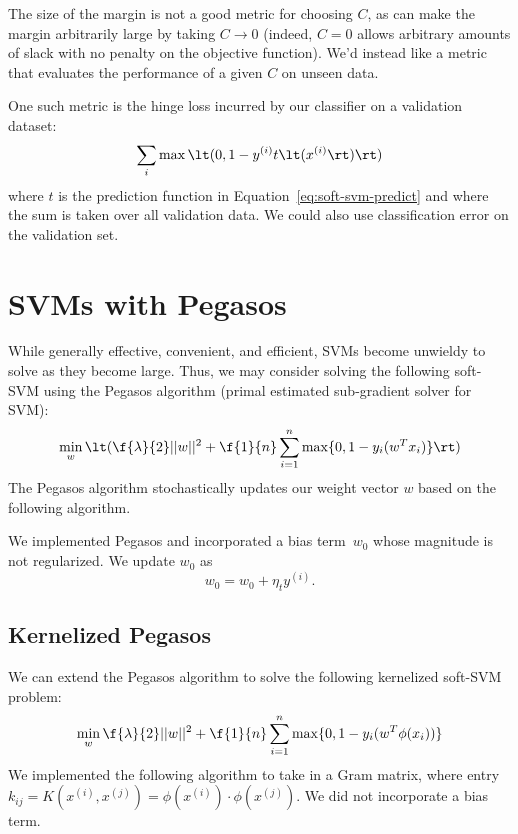 \documentclass{article}
\newcommand{\sind}[1]{^{(#1)}}
\begin{document}
\begin{multicols}{2}
The size of the margin
is not a good metric for choosing $C$,
as can make the margin arbitrarily large
by taking $C \to 0$
(indeed, $C = 0$ allows arbitrary amounts of slack
with no penalty on the objective function).
We'd instead like a metric that evaluates
the performance of a given $C$
on unseen data.

One such metric is the hinge loss incurred
by our classifier on a validation dataset:
\begin{equation}
    \sum_{i} \max\lt(0, 1 - y\sind{i} t\lt(x\sind{i}\rt)\rt)
\end{equation}
where $t$ is the prediction function in Equation~\ref{eq:soft-svm-predict}
and where the sum is taken over all validation data.
We could also use classification error on the validation set.



\section{SVMs with Pegasos}

While generally effective, convenient, and efficient,
SVMs become unwieldy to solve as they become large.
Thus, we may consider solving the following soft-SVM
using the Pegasos algorithm
(primal estimated sub-gradient solver for SVM):
\begin{equation}
   \min_w \lt( \f{\lambda}{2}||w||^2 + \f{1}{n}\sum_{i=1}^n{\max\{0,1-y_i(w^Tx_i)\}} \rt)
\end{equation}
The Pegasos algorithm stochastically updates our weight vector $w$ based on the following algorithm.


We implemented Pegasos and incorporated a bias term~$w_0$ whose magnitude is not regularized.
We update $w_0$ as
\begin{equation}\label{eq:pegasos-svm}
    w_0 = w_0 + \eta_t y^{(i)}.
\end{equation}

\subsection{Kernelized Pegasos}

We can extend the Pegasos algorithm
to solve the following kernelized soft-SVM problem:
\begin{equation}
   \min_w{\f{\lambda}{2}||w||^2} + \f{1}{n}\sum_{i=1}^n{\max\{0,1-y_i(w^T\phi(x_i))\}}
\end{equation}
We implemented the following algorithm to take in a Gram matrix, where entry $k_{ij} = K(x^{(i)},x^{(j)}) = \phi(x^{(i)})\cdot\phi(x^{(j)})$.
We did not incorporate a bias term.


\end{multicols}
\end{document}
